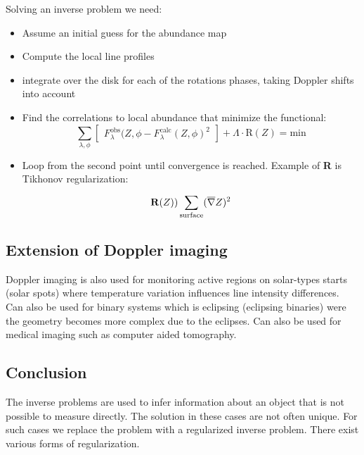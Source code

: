 	Solving an inverse problem we need: 

	\begin{itemize}
	    	\item Assume an initial guess for the abundance map
	    	\item Compute the local line profiles
	    	\item integrate over the disk for each of the rotations phases, taking Doppler shifts into account
	    	\item Find the correlations to local abundance that minimize the functional:
		    	\begin{equation}
		    		\sum_{\lambda, \phi}^{}\begin{bmatrix} F^{\text{obs}}_\lambda(Z,\phi - F^{\text{calc}}_\lambda(Z,\phi)^2 \end{bmatrix} + \Lambda \cdot \text{R}(Z) = \text{min}	  
		    	\end{equation} 
		    \item Loop from the second point until convergence is reached. Example of \textbf{R} is Tikhonov regularization:
			    \begin{equation}
			    	\text{\textbf{R}}(Z) ) \sum_{\text{surface}}^{}(\overline{\nabla} Z)^2 
			    \end{equation}
	    \end{itemize}

	\subsection*{Extension of Doppler imaging}
	Doppler imaging is also used for monitoring active regions on solar-types starts (solar spots) where temperature variation influences line intensity differences. Can also be used for binary systems which is eclipsing (eclipsing binaries) were the geometry becomes more complex due to the eclipses. Can also be used for medical imaging such as computer aided tomography. 

	\subsection*{Conclusion}
	The inverse problems are used to infer information about an object that is not possible to measure directly. The solution in these cases are not often unique. For such cases we replace the problem with a regularized inverse problem. There exist various forms of regularization. 
	        











	 
